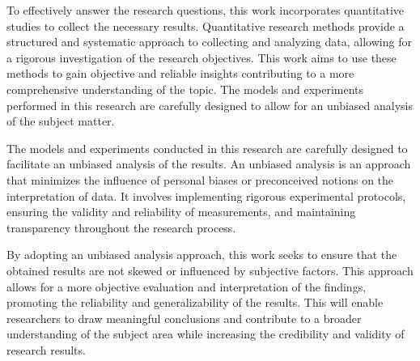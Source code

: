  To effectively answer the research questions, this work incorporates quantitative studies to collect the necessary results. Quantitative research methods provide a structured and systematic approach to collecting and analyzing data, allowing for a rigorous investigation of the research objectives. This work aims to use these methods to gain objective and reliable insights contributing to a more comprehensive understanding of the topic. The models and experiments performed in this research are carefully designed to allow for an unbiased analysis of the subject matter. 

The models and experiments conducted in this research are carefully designed to facilitate an unbiased analysis of the results. An unbiased analysis is an approach that minimizes the influence of personal biases or preconceived notions on the interpretation of data. It involves implementing rigorous experimental protocols, ensuring the validity and reliability of measurements, and maintaining transparency throughout the research process.

By adopting an unbiased analysis approach, this work seeks to ensure that the obtained results are not skewed or influenced by subjective factors. This approach allows for a more objective evaluation and interpretation of the findings, promoting the reliability and generalizability of the results. This will enable researchers to draw meaningful conclusions and contribute to a broader understanding of the subject area while increasing the credibility and validity of research results.